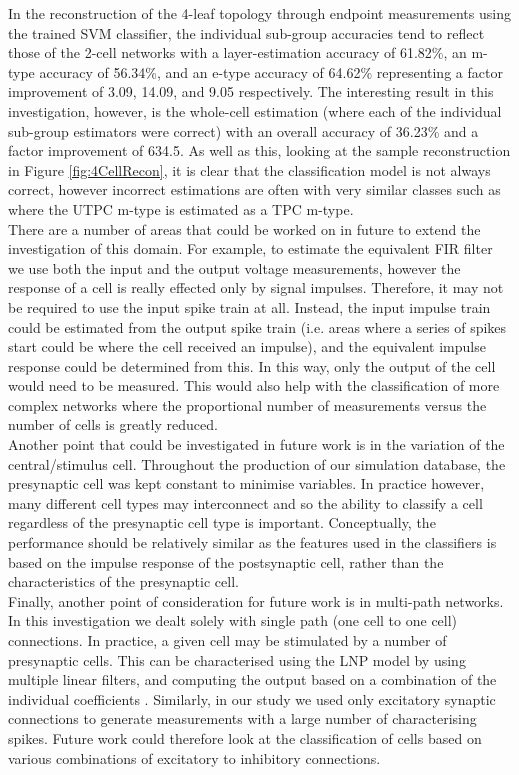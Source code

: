 \documentclass[letterpaper, 10 pt, conference]{ieeeconf}  %
\begin{document}
In the reconstruction of the 4-leaf topology through endpoint measurements using the trained SVM classifier, the individual sub-group accuracies tend to reflect those of the 2-cell networks with a layer-estimation accuracy of 61.82\%, an m-type accuracy of 56.34\%, and an e-type accuracy of 64.62\% representing a factor improvement of 3.09, 14.09, and 9.05 respectively. The interesting result in this investigation, however, is the whole-cell estimation (where each of the individual sub-group estimators were correct) with an overall accuracy of 36.23\% and a factor improvement of 634.5. As well as this, looking at the sample reconstruction in Figure \ref{fig:4CellRecon}, it is clear that the classification model is not always correct, however incorrect estimations are often with very similar classes such as where the UTPC m-type is estimated as a TPC m-type.\\
There are a number of areas that could be worked on in future to extend the investigation of this domain. For example, to estimate the equivalent FIR filter we use both the input and the output voltage measurements, however the response of a cell is really effected only by signal impulses. Therefore, it may not be required to use the input spike train at all. Instead, the input impulse train could be estimated from the output spike train (i.e. areas where a series of spikes start could be where the cell received an impulse), and the equivalent impulse response could be determined from this. In this way, only the output of the cell would need to be measured. This would also help with the classification of more complex networks where the proportional number of measurements versus the number of cells is greatly reduced.\\
Another point that could be investigated in future work is in the variation of the central/stimulus cell. Throughout the production of our simulation database, the presynaptic cell was kept constant to minimise variables. In practice however, many different cell types may interconnect and so the ability to classify a cell regardless of the presynaptic cell type is important. Conceptually, the performance should be relatively similar as the features used in the classifiers is based on the impulse response of the postsynaptic cell, rather than the characteristics of the presynaptic cell.\\
Finally, another point of consideration for future work is in multi-path networks. In this investigation we dealt solely with single path (one cell to one cell) connections. In practice, a given cell may be stimulated by a number of presynaptic cells. This can be characterised using the LNP model by using multiple linear filters, and computing the output based on a combination of the individual coefficients \cite{lnp}. Similarly, in our study we used only excitatory synaptic connections to generate measurements with a large number of characterising spikes. Future work could therefore look at the classification of cells based on various combinations of excitatory to inhibitory connections.
\end{document}
